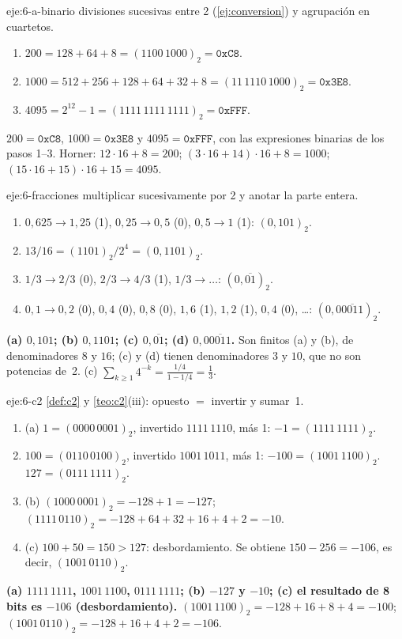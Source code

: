 \begin{solucion}{eje:6-a-binario}
\planteamiento divisiones sucesivas entre 2 (\cref{ej:conversion}) y agrupación en cuartetos.
\pasos
\begin{enumerate}[label=\arabic*.]
  \item $200=128+64+8=(1100\,1000)_2=\texttt{0xC8}$.
  \item $1000=512+256+128+64+32+8=(11\,1110\,1000)_2=\texttt{0x3E8}$.
  \item $4095=2^{12}-1=(1111\,1111\,1111)_2=\texttt{0xFFF}$.
\end{enumerate}
\resultado $200=\texttt{0xC8}$, $1000=\texttt{0x3E8}$ y $4095=\texttt{0xFFF}$, con las expresiones binarias de los pasos 1--3.
\comprobacion Horner: $12\cdot16+8=200$; $(3\cdot16+14)\cdot16+8=1000$; $(15\cdot16+15)\cdot16+15=4095$.
\end{solucion}

\begin{solucion}{eje:6-fracciones}
\planteamiento multiplicar sucesivamente por 2 y anotar la parte entera.
\pasos
\begin{enumerate}[label=(\alph*)]
  \item $0{,}625\to1{,}25$ (1), $0{,}25\to0{,}5$ (0), $0{,}5\to1$ (1): $(0{,}101)_2$.
  \item $13/16=(1101)_2/2^4=(0{,}1101)_2$.
  \item $1/3\to2/3$ (0), $2/3\to4/3$ (1), $1/3\to\dots$: $(0{,}\overline{01})_2$.
  \item $0{,}1\to0{,}2$ (0), $0{,}4$ (0), $0{,}8$ (0), $1{,}6$ (1), $1{,}2$ (1), $0{,}4$ (0), \dots: $(0{,}0\overline{0011})_2$.
\end{enumerate}
\resultado \textbf{(a) $0{,}101$; (b) $0{,}1101$; (c) $0{,}\overline{01}$; (d) $0{,}0\overline{0011}$.} Son finitos (a) y (b), de denominadores $8$ y $16$; (c) y (d) tienen denominadores $3$ y $10$, que no son potencias de~2.
\comprobacion (c) $\sum_{k\ge1}4^{-k}=\frac{1/4}{1-1/4}=\frac13$.
\end{solucion}

\begin{solucion}{eje:6-c2}
\planteamiento \cref{def:c2} y \cref{teo:c2}(iii): opuesto $=$ invertir y sumar~1.
\pasos
\begin{enumerate}[label=\arabic*.]
  \item (a) $1=(0000\,0001)_2$, invertido $1111\,1110$, más 1: $-1=(1111\,1111)_2$.
  \item $100=(0110\,0100)_2$, invertido $1001\,1011$, más 1: $-100=(1001\,1100)_2$. $127=(0111\,1111)_2$.
  \item (b) $(1000\,0001)_2=-128+1=-127$; $(1111\,0110)_2=-128+64+32+16+4+2=-10$.
  \item (c) $100+50=150>127$: desbordamiento. Se obtiene $150-256=-106$, es decir, $(1001\,0110)_2$.
\end{enumerate}
\resultado \textbf{(a) $1111\,1111$, $1001\,1100$, $0111\,1111$; (b) $-127$ y $-10$; (c) el resultado de 8 bits es $-106$ (desbordamiento).}
\comprobacion $(1001\,1100)_2=-128+16+8+4=-100$; $(1001\,0110)_2=-128+16+4+2=-106$.
\end{solucion}

